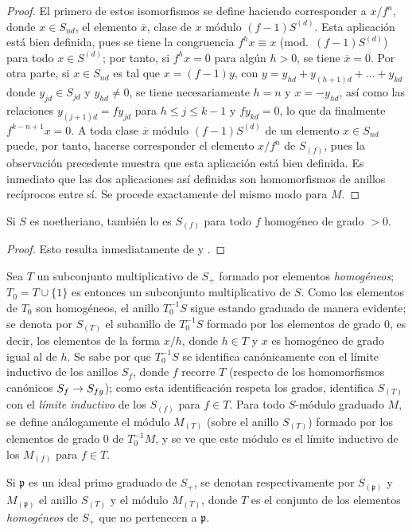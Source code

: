 \documentclass[oneside,10pt]{amsart}
\makeatletter
\renewcommand{\leq}{\leqslant}
\newcommand{\ega@arrow}[2]{\mathchoice{#1}{#2}{#2}{#2}}
\renewcommand{\to}{\ega@arrow{\longrightarrow}{\rightarrow}}
\newcommand{\oldpage}[2][]{\marginnote{\normalfont\footnotesize\textbf{#1}~|~#2}\ignorespaces}
\let\EGAOriginalLabel\label
\renewcommand{\label}[1]{\phantomsection\EGAOriginalLabel{#1}}
\makeatother
\begin{document}
\begin{proof}
El primero de estos isomorfismos se define haciendo corresponder a $x/f^n$, donde $x\in S_{nd}$, el elemento $\overline{x}$, clase de $x$ módulo $(f-1)S^{(d)}$.
Esta aplicación está bien definida, pues se tiene la congruencia
$f^h x\equiv x$ (mod.~$(f-1)S^{(d)}$)
para todo $x\in S^{(d)}$; por tanto, si $f^h x=0$ para algún $h>0$,
\oldpage[II]{25}
se tiene $\overline{x}=0$.
Por otra parte, si $x\in S_{nd}$ es tal que $x=(f-1)y$, con
$y=y_{hd}+y_{(h+1)d}+\ldots+y_{kd}$
donde $y_{jd}\in S_{jd}$ y $y_{hd}\neq 0$, se tiene necesariamente $h=n$ y $x=-y_{hd}$, así como las relaciones $y_{(j+1)d}=fy_{jd}$ para $h\leq j\leq k-1$ y $fy_{kd}=0$, lo que da finalmente $f^{k-n+1}x=0$.
A toda clase $\overline{x}$ módulo $(f-1)S^{(d)}$ de un elemento $x\in S_{nd}$ puede, por tanto, hacerse corresponder el elemento $x/f^n$ de $S_{(f)}$, pues la observación precedente muestra que esta aplicación está bien definida.
Es inmediato que las dos aplicaciones así definidas son homomorfismos de anillos recíprocos entre sí.
Se procede exactamente del mismo modo para $M$.
\end{proof}

\begin{corollary}[2.2.6]
\label{II.2.2.6-fr}
Si $S$ es noetheriano, también lo es $S_{(f)}$ para todo $f$ homogéneo de grado $>0$.
\end{corollary}

\begin{proof}
Esto resulta inmediatamente de  y .
\end{proof}

\begin{env}[2.2.7]
\label{II.2.2.7-fr}
Sea $T$ un subconjunto multiplicativo de $S_+$ formado por elementos \emph{homogéneos}; $T_0=T\cup\{1\}$ es entonces un subconjunto multiplicativo de $S$.
Como los elementos de $T_0$ son homogéneos, el anillo $T_0^{-1}S$ sigue estando graduado de manera evidente; se denota por $S_{(T)}$ el subanillo de $T_0^{-1}S$ formado por los elementos de grado $0$, es decir, los elementos de la forma $x/h$, donde $h\in T$ y $x$ es homogéneo de grado igual al de $h$.
Se sabe por  que $T_0^{-1}S$ se identifica canónicamente con el límite inductivo de los anillos $S_f$, donde $f$ recorre $T$ (respecto de los homomorfismos canónicos $S_f\to S_{fg}$); como esta identificación respeta los grados, identifica $S_{(T)}$ con el \emph{límite inductivo} de los $S_{(f)}$ para $f\in T$.
Para todo $S$-módulo graduado $M$, se define análogamente el módulo $M_{(T)}$ (sobre el anillo $S_{(T)}$) formado por los elementos de grado $0$ de $T_0^{-1}M$, y se ve que este módulo es el límite inductivo de los $M_{(f)}$ para $f\in T$.

Si $\mathfrak{p}$ es un ideal primo graduado de $S_+$, se denotan respectivamente por $S_{(\mathfrak{p})}$ y $M_{(\mathfrak{p})}$ el anillo $S_{(T)}$ y el módulo $M_{(T)}$, donde $T$ es el conjunto de los elementos \emph{homogéneos} de $S_+$ que no pertenecen a $\mathfrak{p}$.
\end{env}
\end{document}
